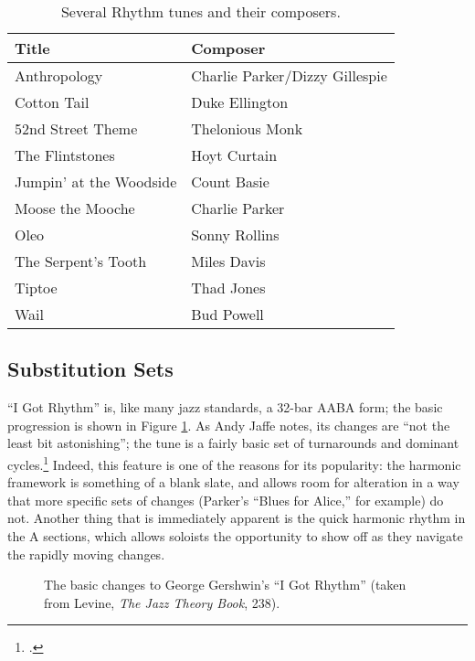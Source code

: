 \begin{table}[tbp]
  \setlength{\tabcolsep}{12pt}
  \centering
  \begin{tabular}{ll}
    Title  & Composer \\
    \hline
    \rule[1em]{0ex}{1ex}%
    Anthropology        & Charlie Parker/Dizzy Gillespie \\
    Cotton Tail         & Duke Ellington \\
    52nd Street Theme   & Thelonious Monk \\
    The Flintstones     & Hoyt Curtain \\
    Jumpin' at the Woodside & Count Basie \\
    Moose the Mooche    & Charlie Parker \\
    Oleo                & Sonny Rollins \\
    The Serpent's Tooth & Miles Davis \\
    Tiptoe              & Thad Jones \\
    Wail                & Bud Powell
  \end{tabular}
  \caption{Several Rhythm tunes and their composers.}
  \label{rcg:rhythm-tunes}
\end{table}

\subsection{Substitution Sets}
\label{subsec:substitution-sets}

``I Got Rhythm'' is, like many jazz standards, a 32-bar AABA form; the basic
progression is shown in Figure \ref{rcg:rhythm-basic}. As Andy Jaffe
notes, its changes are ``not the least bit astonishing''; the tune is a fairly
basic set of turnarounds and dominant cycles.\footcite[149]{jaffe:1996}
Indeed, this feature is one of the reasons for its popularity: the harmonic
framework is something of a blank slate, and allows room for alteration in a
way that more specific sets of changes (Parker's ``Blues for Alice,'' for
example) do not. Another thing that is immediately apparent is the quick
harmonic rhythm in the A sections, which allows soloists the opportunity to
show off as they navigate the rapidly moving changes.

\begin{figure}[tbp]
  \caption[The basic changes to George Gershwin's ``I Got Rhythm.'']{%
    The basic changes to George Gershwin's ``I Got Rhythm'' (taken from
    Levine, \emph{The Jazz Theory Book}, 238).}\nocite{levine:1995}
  \label{rcg:rhythm-basic}
\end{figure}

